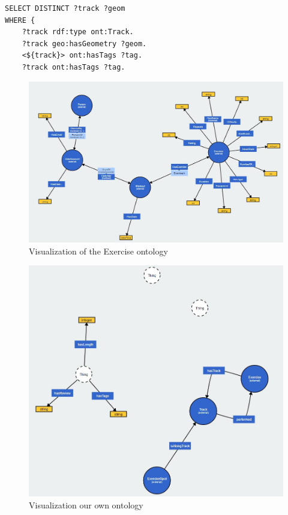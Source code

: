 \documentclass[11pt,a4paper]{scrreprt}
\begin{document}
\begin{lstlisting}[caption={Query for tracks with a tag common with a specified track }, label = query:tracksbiking ]
SELECT DISTINCT ?track ?geom
WHERE {
    ?track rdf:type ont:Track.
    ?track geo:hasGeometry ?geom.
    <${track}> ont:hasTags ?tag.
    ?track ont:hasTags ?tag.
\end{lstlisting}
\begin{figure}[h]
    \includegraphics[width=\textwidth]{exOntology.png}
    \caption{Visualization of the Exercise ontology}
    \label{db:exont}
\end{figure}
\begin{figure}[h]
    \includegraphics[width=\textwidth]{ownOntology.png}
    \caption{Visualization our own ontology}
    \label{db:ownont}
\end{figure}
\end{document}
